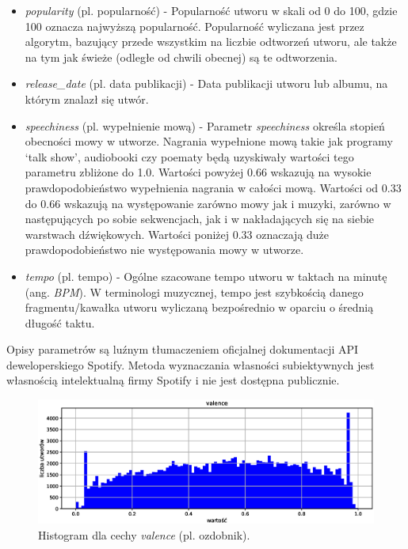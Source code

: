\documentclass[a4paper,11pt]{article}
\begin{document}
\begin{itemize}
        \item \textit{popularity} (pl. popularność) - Popularność utworu w skali od 0 do 100, gdzie 100 oznacza najwyższą popularność. Popularność wyliczana jest przez algorytm, bazujący przede wszystkim na liczbie odtworzeń utworu, ale także na tym jak świeże (odległe od chwili obecnej) są te odtworzenia.
        \item \textit{release\_date} (pl. data publikacji) - Data publikacji utworu lub albumu, na którym znalazł się utwór.
        \item \textit{speechiness} (pl. wypełnienie mową) - Parametr \textit{speechiness} określa stopień obecności mowy w utworze. Nagrania wypełnione mową takie jak programy `talk show', audiobooki czy poematy będą uzyskiwały wartości tego parametru zbliżone do 1.0. Wartości powyżej 0.66 wskazują na wysokie prawdopodobieństwo wypełnienia nagrania w całości mową. Wartości od 0.33 do 0.66 wskazują na występowanie zarówno mowy jak i muzyki, zarówno w następujących po sobie sekwencjach, jak i w nakładających się na siebie warstwach dźwiękowych. Wartości poniżej 0.33 oznaczają duże prawdopodobieństwo nie występowania mowy w utworze.
        \item \textit{tempo} (pl. tempo) - Ogólne szacowane tempo utworu w taktach na minutę (ang. \textit{BPM}). W terminologi muzycznej, tempo jest szybkością danego fragmentu/kawałka utworu wyliczaną bezpośrednio w oparciu o średnią długość taktu.
    \end{itemize}

    \smallskip

    Opisy parametrów są luźnym tłumaczeniem oficjalnej dokumentacji API deweloperskiego Spotify\cite{SpotifyWebAPIReference}. Metoda wyznaczania własności subiektywnych jest własnością intelektualną firmy Spotify i nie jest dostępna publicznie.

    \bigskip

    \begin{figure}[H]
        \label{fig:valence}
        \centering
        \includegraphics[width=\textwidth]{valence}
        \caption{Histogram dla cechy \textit{valence} (pl. ozdobnik).}
    \end{figure}
\end{document}
